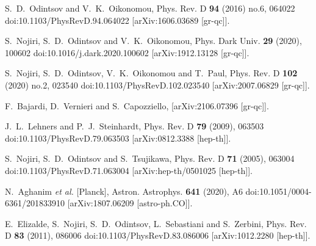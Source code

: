 \documentclass{article}
\begin{document}
\begin{thebibliography}{99}
S.~D.~Odintsov and V.~K.~Oikonomou,
Phys. Rev. D \textbf{94} (2016) no.6, 064022
doi:10.1103/PhysRevD.94.064022
[arXiv:1606.03689 [gr-qc]].


S.~Nojiri, S.~D.~Odintsov and V.~K.~Oikonomou,
Phys. Dark Univ. \textbf{29} (2020), 100602
doi:10.1016/j.dark.2020.100602
[arXiv:1912.13128 [gr-qc]].


S.~Nojiri, S.~D.~Odintsov, V.~K.~Oikonomou and T.~Paul,
Phys. Rev. D \textbf{102} (2020) no.2, 023540
doi:10.1103/PhysRevD.102.023540
[arXiv:2007.06829 [gr-qc]].

F.~Bajardi, D.~Vernieri and S.~Capozziello,
[arXiv:2106.07396 [gr-qc]].


J.~L.~Lehners and P.~J.~Steinhardt,
Phys. Rev. D \textbf{79} (2009), 063503
doi:10.1103/PhysRevD.79.063503
[arXiv:0812.3388 [hep-th]].


S.~Nojiri, S.~D.~Odintsov and S.~Tsujikawa,
Phys. Rev. D \textbf{71} (2005), 063004
doi:10.1103/PhysRevD.71.063004
[arXiv:hep-th/0501025 [hep-th]].

N.~Aghanim \textit{et al.} [Planck],
Astron. Astrophys. \textbf{641} (2020), A6
doi:10.1051/0004-6361/201833910
[arXiv:1807.06209 [astro-ph.CO]].

E.~Elizalde, S.~Nojiri, S.~D.~Odintsov, L.~Sebastiani and S.~Zerbini,
Phys. Rev. D \textbf{83} (2011), 086006
doi:10.1103/PhysRevD.83.086006
[arXiv:1012.2280 [hep-th]].



\end{thebibliography}
\end{document}
